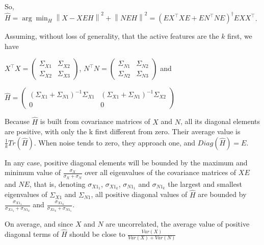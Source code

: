 \documentclass{article}
\begin{document}
So, $\hat H = \arg \min_H  \left \| X - XEH\right\| ^2  + \left \| NEH\right \| ^2 = (E X^\top XE +EN^\top NE) ^\dagger EXX^\top$.

Assuming, without loss of generality, that the active features are the $k$ first, we have 

$X^\top X = \left(\begin{array}{lccl}\Sigma_{X1} & \Sigma_{X2} \\ \Sigma_{X2} & \Sigma_{X3}\end{array}\right)$, $N^\top N = \left(\begin{array}{lccl}\Sigma_{N1} & \Sigma_{N2} \\ \Sigma_{N2} & \Sigma_{N3}\end{array}\right)$ and 

$\hat H = \left(\begin{array}{cc}(\Sigma_{X1}+\Sigma_{N1})^{-1}\Sigma_{X1} & (\Sigma_{X1}+\Sigma_{N1})^{-1}\Sigma_{X2} \\0 & 0\end{array}\right)$

Because $\hat H$ is built from covariance matrices of $X$ and $N$, all its diagonal elements are positive, with only the k first different from zero. Their average value is $\frac{1}{k} Tr(\hat H)$. When noise tends to zero, they approach one, and $Diag(\hat H) = E$.

In any case, positive diagonal elements will be bounded by the maximum and minimum value of $\frac{\sigma_X}{\sigma_X + \sigma_N}$ over all eigenvalues of the covariance matrices of $XE$ and $NE$, that is, denoting $\sigma_{X1_1}$, $\sigma_{X1_k}$, $\sigma_{N1_1}$ and $\sigma_{N1_k}$ the largest and smallest eigenvalues of $\Sigma_{X1}$ and $\Sigma_{N1}$, all positive diagonal values of $\hat H$ are bounded by $\frac{\sigma_{X1_1}}{\sigma_{X1_1} +\sigma_{N1_k}}$ and $\frac{\sigma_{X1_k}}{\sigma_{X1_k} +\sigma_{N1_1}}$.

On average, and since $X$ and $N$ are uncorrelated, the average value of positive diagonal terms of $\hat H$ should be close to $\frac{Var(X)}{Var(X)+Var(N)}$ 
\end{document}
